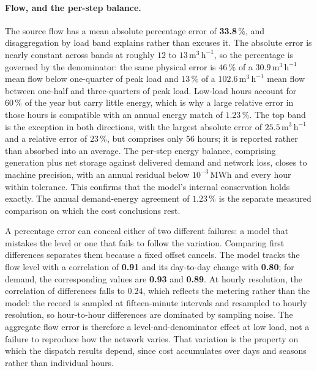 \documentclass[a4paper,fleqn]{cas-sc}
\begin{document}
\paragraph{Flow, and the per-step balance.}
The source flow has a mean absolute percentage error of \textbf{33.8}\,\%, and disaggregation
by load band explains rather than excuses it. The absolute error is nearly constant across
bands at roughly \(12\) to \(13\,\mathrm{m^3\,h^{-1}}\), so the percentage is governed by
the denominator: the same physical error is \(46\,\%\) of a
\(30.9\,\mathrm{m^3\,h^{-1}}\) mean flow below one-quarter of peak load and \(13\,\%\) of a
\(102.6\,\mathrm{m^3\,h^{-1}}\) mean flow between one-half and three-quarters of peak load.
Low-load hours account for \(60\,\%\) of the year but carry little energy, which is why a
large relative error in those hours is compatible with an annual energy match of
\(1.23\,\%\). The top band is the exception in both directions, with the largest absolute
error of \(25.5\,\mathrm{m^3\,h^{-1}}\) and a relative error of \(23\,\%\), but comprises
only 56 hours; it is reported rather than absorbed into an average. The per-step energy
balance, comprising generation plus net storage against delivered demand and network loss,
closes to machine precision, with an annual residual below \(10^{-3}\,\mathrm{MWh}\) and
every hour within tolerance. This confirms that the model's internal conservation holds
exactly. The annual demand-energy agreement of \(1.23\,\%\) is the separate measured
comparison on which the cost conclusions rest.

A percentage error can conceal either of two different failures: a model that mistakes the
level or one that fails to follow the variation. Comparing first differences separates them
because a fixed offset cancels. The model tracks the flow level with a correlation of
\textbf{0.91} and its day-to-day change with \textbf{0.80}; for demand, the corresponding
values are \textbf{0.93} and \textbf{0.89}. At hourly resolution, the correlation of
differences falls to \(0.24\), which reflects the metering rather than the model: the record
is sampled at fifteen-minute intervals and resampled to hourly resolution, so hour-to-hour
differences are dominated by sampling noise. The aggregate flow error is therefore a
level-and-denominator effect at low load, not a failure to reproduce how the network varies.
That variation is the property on which the dispatch results depend, since cost accumulates
over days and seasons rather than individual hours.
\end{document}
